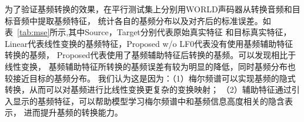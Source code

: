 为了验证基频转换的效果，在平行测试集上分别用WORLD声码器从转换音频和目标音频中提取基频特征，
统计各自的基频分布以及对齐后的标准误差。如表~\ref{tab:mse}所示,其中Source，Target分别代表原始真实特征
和目标真实特征，Linear代表线性变换的基频特征，Proposed w/o LF0代表没有使用基频辅助特征转换的基频，
Proposed代表使用了基频辅助特征后转换的基频。可以发现相比于线性变换，
基频辅助特征所转换的基频误差有较为明显的降低，同时基频分布也较接近目标的基频分布。
我们认为这是因为：（1）梅尔频谱可以实现基频的隐式转换，从而可以对基频进行比线性变换更复杂的变换映射；
（2）辅助特征通过引入显示的基频特征，可以帮助模型学习梅尔频谱中和基频信息高度相关的隐含表示，
进而提升基频的转换能力。

\begin{table} 
    \centering 


\end{table}

